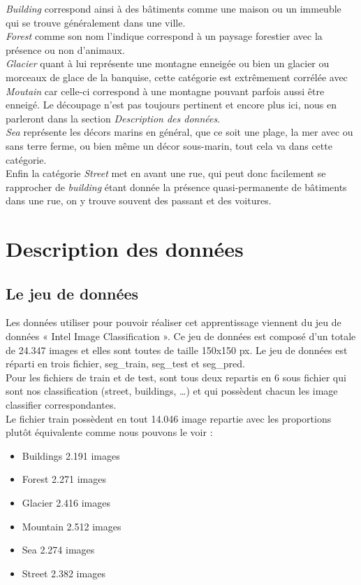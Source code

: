 \documentclass[12pt ,a4paper ]{article}
\begin{document}
\begin{multicols}{2}
\bigskip
\textit{Building} correspond ainsi à des bâtiments comme une maison ou un immeuble qui se trouve généralement dans une ville. \\
\textit{Forest} comme son nom l'indique correspond à un paysage forestier avec la présence ou non d'animaux. \\
\textit{Glacier} quant à lui représente une montagne enneigée ou bien un glacier ou morceaux de glace de la banquise, cette catégorie est extrêmement corrélée avec \textit{Moutain} car celle-ci correspond à une montagne pouvant parfois aussi être enneigé. Le découpage n'est pas toujours pertinent et encore plus ici, nous en parleront dans la section \textit{Description des données}.\\
 \textit{Sea} représente les décors marins en général, que ce soit une plage, la mer avec ou sans terre ferme, ou bien même un décor sous-marin, tout cela va dans cette catégorie. \\
Enfin la catégorie \textit{Street} met en avant une rue, qui peut donc facilement se rapprocher de \textit{building} étant donnée la présence quasi-permanente de bâtiments dans une rue, on y trouve souvent des passant et des voitures.  

\newpage
\section{Description des données}

\subsection{Le jeu de données}

	Les données utiliser pour pouvoir réaliser cet apprentissage viennent du jeu de données « Intel Image Classification ». Ce jeu de données est composé d’un totale de 24.347 images et elles sont toutes de taille 150x150 px. Le jeu de données est réparti en trois fichier, seg\_train, seg\_test et seg\_pred. \\
Pour les fichiers de train et de test, sont tous deux repartis en 6 sous fichier qui sont nos classification (street, buildings, …) et qui possèdent chacun les image classifier correspondantes.\\
Le fichier train possèdent en tout 14.046 image repartie avec les proportions plutôt équivalente comme nous pouvons le voir :

\begin{itemize}
\item Buildings 2.191 images
\item Forest 2.271 images
\item Glacier 2.416 images
\item Mountain 2.512 images
\item Sea 2.274 images
\item Street 2.382 images
\end{itemize}


\end{multicols}
\end{document}

